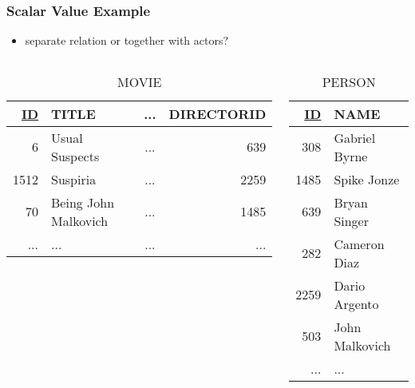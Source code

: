 \documentclass[dvipsnames]{beamer}
\theoremstyle{plain}
\begin{document}
\begin{frame}
  \frametitle{Scalar Value Example}

  \begin{example}
    \begin{itemize}
      \item separate relation or together with actors?
    \end{itemize}

    \pause
    \begin{columns}[t]
      \begin{tiny}
      \begin{table}
        \caption{MOVIE}
        \begin{tabular}{|r|l|c|r|}\hline
\underline{ID} & TITLE      & ... & DIRECTORID\\\hline\hline
   6 & Usual Suspects       & ... &        639\\\hline
1512 & Suspiria             & ... &       2259\\\hline
  70 & Being John Malkovich & ... &       1485\\\hline
 ... & ...                  & ... &        ...\\\hline
        \end{tabular}
      \end{table}
      \end{tiny}

      \begin{tiny}
      \begin{table}
        \caption{PERSON}
        \begin{tabular}{|r|l|}\hline
\underline{ID} & NAME\\\hline\hline
 308 & Gabriel Byrne \\\hline
1485 & Spike Jonze   \\\hline
 639 & Bryan Singer  \\\hline
 282 & Cameron Diaz  \\\hline
2259 & Dario Argento \\\hline
 503 & John Malkovich\\\hline
 ... & ...           \\\hline
        \end{tabular}
      \end{table}
      \end{tiny}
    \end{columns}
  \end{example}
\end{frame}
\end{document}
